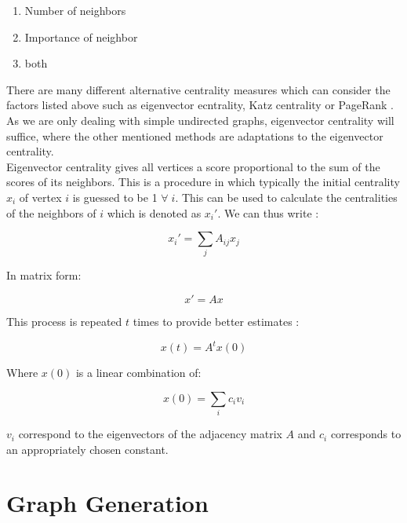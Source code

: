 	\begin{enumerate}
		\item Number of neighbors
		\item Importance of neighbor
		\item both
	\end{enumerate}

	\noindent There are many different alternative centrality measures which
	can consider the factors listed above such as eigenvector ecntrality, Katz
	centrality or PageRank
	\citep{katz1953new,page1999pagerank,landau1895relativen,Newman2010}. As we 
	are only dealing with simple undirected graphs, eigenvector centrality will 
	suffice, where the other mentioned methods are adaptations to the 
	eigenvector centrality. \\

	\noindent Eigenvector centrality gives all vertices a score proportional to
	the sum of the scores of its neighbors. This is a procedure in which
	typically the initial centrality $x_i$ of vertex $i$ is guessed to be 1
	$\forall \; i$. This can be used to calculate the centralities of the
	neighbors of $i$ which is denoted as $x_{i}'$. We can thus write
	\citep[p. 169]{Newman2010}:

	\begin{equation}
		x_i' = \sum_{j}A_{ij}x_j
	\end{equation}

	\noindent In matrix form:

	\begin{equation}
		x' = Ax
	\end{equation}

	\noindent This process is repeated $t$ times to provide better estimates
	\citep[p. 170]{Newman2010}:

	\begin{equation}
		x(t) =  A^tx(0)
	\end{equation}

	\noindent Where $x(0)$ is a linear combination of:

	\begin{equation}
		x(0) =  \sum_{i}c_{i}v_{i}
	\end{equation}

	\noindent $v_i$ correspond to the eigenvectors of the adjacency matrix $A$
	and $c_i$ corresponds to an appropriately chosen constant. 



	

	\section{Graph Generation}

